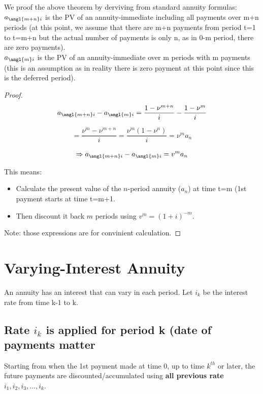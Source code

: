 \begin{comments}
    We proof the above theorem by derviving from standard annuity formulas: \\

    $a_{\angl{m+n}i}$ is the PV of an annuity-immediate including all payments over m+n periods (at this point, we assume that there are m+n payments from period t=1 to t=m+n but the actual number of payments is only n, as in 0-m period, there are zero payments).\\
    
    $a_{\angl{m}i}$ is the PV of an annuity-immediate over m periods with m payments (this is an assumption as in reality there is zero payment at this point since this is the deferred period). 
\end{comments}

\begin{proof}
    \[
a_{\angl{m+n}i} - a_{\angl{m}i} = \frac{1 - \nu^{m+n}}{i} - \frac{1 - \nu^m}{i}
\]

\[
= \frac{\nu^m - \nu^{m+n}}{i}
= \frac{\nu^m (1 - \nu^n)}{i}
= \nu^m a_n
\]

\[
\Rightarrow a_{\angl{m+n}i} - a_{\angl{m}i} = v^m a_n
\]

This means:
\begin{itemize}
    \item Calculate the present value of the \( n \)-period annuity (\( a_n \)) at time t=m (1st payment starts at time t=m+1. 
    \item Then discount it back \( m \) periods using \( v^m = (1 + i)^{-m} \).
\end{itemize}

Note: those expressions are for convinient calculation.

\end{proof}
\section{Varying-Interest Annuity}
\begin{definition}
    An annuity has an interest that can vary in each period. Let $i_k$ be the interest rate from time k-1 to k. 
\end{definition}

\subsection{Rate $i_k$ is applied for period k (date of payments matter}
\begin{comments}
    Starting from when the 1st payment made at time 0, up to time $k^{th}$ or later, the future payments are discounted/accumulated using \textbf{all previous rate} $i_1, i_2, i_3,...,i_k$. \\
\end{comments}



